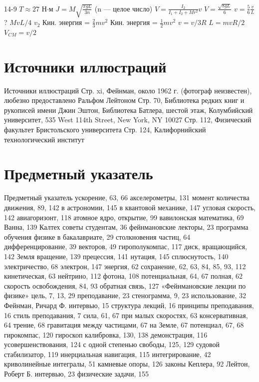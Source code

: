 \documentclass[10pt,oneside]{article}
\begin{document}
14-9 \(T \approx 27\) Н\ensuremath{\cdot}м \(J = M \sqrt{\frac{\pi g L}{3 n}}\) (n --- целое число) \(V = \frac{I_2}{I_1 + I_2 + Mr^2} v\) \(V = \frac{\sqrt{8gL}}{6}\) \(v = \frac{5}{6} \frac{v}{L}\)? \(MvL/4\) \(v_2\) Кин. энергия = \(\frac{2}{3} mv^2\) Кин. энергия = \(\frac{1}{2} mv^2\) \(v = v/3R\) \(L = mvR/2\) \(V_{CM} = v/2\)\par

\clearpage
{}
\section*{Источники иллюстраций}
\label{tips-sec-14-источники-иллюстраций}
Источники иллюстраций Стр. xi, Фейнман, около 1962 г. (фотограф неизвестен), любезно предоставлено Ральфом Лейтоном Стр. 70, Библиотека редких книг и рукописей имени Джин Эштон, Библиотека Батлера, шестой этаж, Колумбийский университет, 535 West 114th Street, New York, NY 10027 Стр. 112, Физический факультет Бристольского университета Стр. 124, Калифорнийский технологический институт\par

\clearpage
{}
\section*{Предметный указатель}
\label{tips-sec-15-предметный-указатель}
Предметный указатель ускорение, 63, 66 акселерометры, 131 момент количества движения, 89, 142 в астрономии, 145 в квантовой механике, 147 угловая скорость, 142 авиагоризонт, 118 атомное ядро, открытие, 99 вавилонская математика, 69 Ванна, 139 Калтех советы студентам, 36 фейнмановские лекторы, 23 программа обучения физике в бакалавриате, 29 столкновения частиц, 64 дифференцирование, 39 векторов, 49 гирополукомпас, 117 диск, вращающийся, 142 Земля вращение, 139 прецессия, 141 нутация, 145 сплюснутость, 140 электричество, 68 электрон, 147 энергия, 62 сохранение, 62, 63, 84, 85, 93, 112 кинетическая, 63 нейтрино, 112 фотона, 108 потенциальная, 64, 67 полная, 62 скорость освобождения, 84, 93 обратная связь, 127 «Фейнмановские лекции по физике» цель, 7, 13, 29 преподавание, 23 стенограмма, 9, 23 использование, 32 Фейнман, Ричард Ф. интервью, 15 структура лекций, 16 принципы преподавания, 16 стиль преподавания, 7 сила, 61, 67 при малых скоростях, 63 консервативная, 64 трение, 68 гравитация между частицами, 67 на Земле, 67 потенциал, 67, 68 гирокомпас, 120 гироскоп калибровка, 130, 138 демонстрация, 116 усовершенствования, 124 с одной степенью свободы, 125, 129 судовой стабилизатор, 119 инерциальная навигация, 115 интегрирование, 42 криволинейные интегралы, 51 камневые опоры, 126 законы Кеплера, 92 Лейтон, Роберт Б. интервью, 23 физические задачи, 155\par
\end{document}
